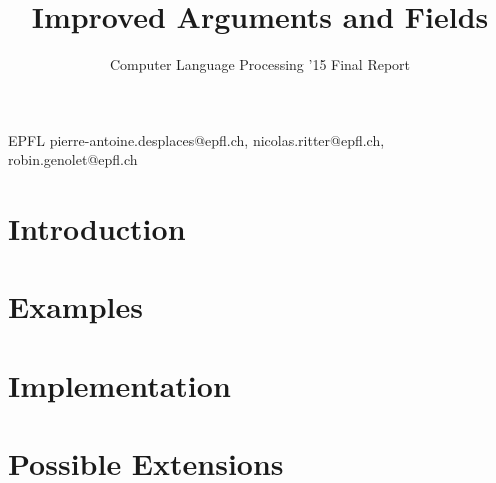 \documentclass[nocopyrightspace,11pt,authoryear,preprint]{sigplanconf}
\begin{document}


\title{Improved Arguments and Fields}
\subtitle{Computer Language Processing '15 Final Report}

           {EPFL}
           {pierre-antoine.desplaces@epfl.ch, nicolas.ritter@epfl.ch, robin.genolet@epfl.ch}

\maketitle

\section{Introduction}


\section{Examples}


\section{Implementation}


\section{Possible Extensions}




\end{document}
